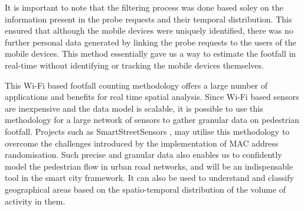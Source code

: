 \documentclass[11t, a4paper, twocolumn]{article}
\begin{document}
	It is important to note that the filtering process was done based soley on the information present in the probe requests and their temporal distribution. This ensured that although the mobile devices were uniquely identified, there was no further personal data generated by linking the probe requests to the users of the mobile devices. This method essentially gave us a way to estimate the footfall in real-time without identifying or tracking the mobile devices themselves.

	This Wi-Fi based footfall counting methodology offers a large number of applications and benefits for real time spatial analysis. Since Wi-Fi based sensors are inexpensive and the data model is scalable, it is possible to use this methodology for a large network of sensors to gather granular data on pedestrian footfall. Projects such as SmartStreetSensors \citep{sss2016}, may utilise this methodology to overcome the challenges introduced by the implementation of MAC address randomisation. Such precise and granular data also enables us to confidently model the pedestrian flow in urban road networks, and will be an indispensable tool in the smart city framework. It can also be used to understand and classify geographical areas based on the spatio-temporal distribution of the volume of activity in them.

	\printbibliography[title={References}]
\end{document}
